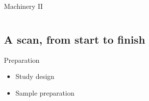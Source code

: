 \documentclass[aspectratio=169,10pt]{beamer}
\begin{document}
\begin{frame}{Machinery II}
	\begin{columns}
		\hfill
		\begin{column}{0.4\linewidth}
			
		\end{column}
		\hfill		
		\begin{column}{0.4\linewidth}
			
		\end{column}
		\hfill
	\end{columns}
\end{frame}


\subsection{A scan, from start to finish}
\begin{frame}{Preparation}
	\begin{itemize}
		\item Study design
		\item Sample preparation
	\end{itemize}
\end{frame}
\end{document}
